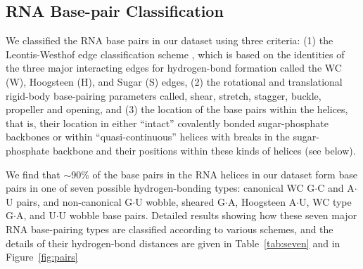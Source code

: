 \subsection{RNA Base-pair Classification}
We classified the RNA base  pairs in our dataset using three criteria:
(1) the Leontis-Westhof edge classification scheme \cite{leontis1998},
which is based on the  identities of the three major interacting edges
for  hydrogen-bond formation  called the  WC (W),  Hoogsteen  (H), and
Sugar  (S)  edges, (2)  the  rotational  and translational  rigid-body
base-pairing  parameters  called,  shear,  stretch,  stagger,  buckle,
propeller and opening, and (3) the location of the base pairs within
the helices,  that is, their location in  either ``intact'' covalently
bonded   sugar-phosphate  backbones  or   within  ``quasi-continuous''
helices  with  breaks  in   the  sugar-phosphate  backbone  and  their
positions within these kinds of helices (see below).

We find  that $\sim$90\% of the base  pairs in the RNA  helices in our
dataset  form base  pairs in  one of  seven  possible hydrogen-bonding
types: canonical  WC G$\cdot$C and A$\cdot$U  pairs, and non-canonical
G$\cdot$U  wobble,  sheared G$\cdot$A,  Hoogsteen  A$\cdot$U, WC  type
G$\cdot$A, and  U$\cdot$U wobble base pairs.  Detailed results showing
how these seven major  RNA base-pairing types are classified according
to various  schemes, and the details of  their hydrogen-bond distances
are given in Table~\ref{tab:seven} and in Figure~\ref{fig:pairs}


